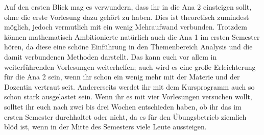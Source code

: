 Auf den ersten Blick mag es verwundern, dass ihr in die Ana 2 einsteigen sollt, ohne die erste Vorlesung dazu gehört zu haben. Dies ist theoretisch zumindest möglich, jedoch vermutlich mit ein wenig Mehraufwand verbunden. Trotzdem können mathematisch Ambitionierte natürlich auch die Ana 1 im ersten Semester hören, da diese eine schöne Einführung in den Themenbereich Analysis und die damit verbundenen Methoden darstellt. Das kann euch vor allem in weiterführenden Vorlesungen weiterhelfen; auch wird es eine große Erleichterung für die Ana 2 sein, wenn ihr schon ein wenig mehr mit der Materie und der Dozentin vertraut seit. Andererseits werdet ihr mit dem Kursprogramm auch so schon stark ausgelastet sein. Wenn ihr es mit vier Vorlesungen versuchen wollt, solltet ihr euch nach zwei bis drei Wochen entschieden haben, ob ihr das im ersten Semester durchhaltet oder nicht, da es für den Übungsbetrieb ziemlich blöd ist, wenn in der Mitte des Semesters viele Leute aussteigen.


